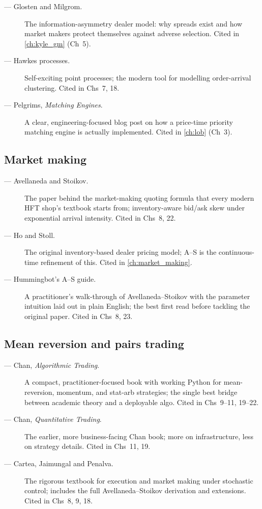 \begin{description}
  \item[\citet{glosten1985bid} --- Glosten and Milgrom.] The
    information-asymmetry dealer model: why spreads exist and how
    market makers protect themselves against adverse selection.
    Cited in \cref{ch:kyle_gm} (Ch~5).
  \item[\citet{hawkes1971spectra} --- Hawkes processes.] Self-exciting
    point processes; the modern tool for modelling order-arrival
    clustering. Cited in Chs~7, 18.
  \item[\citet{pelgrims2020matching} --- Pelgrims, \emph{Matching
    Engines}.] A clear, engineering-focused blog post on how a
    price-time priority matching engine is actually implemented.
    Cited in \cref{ch:lob} (Ch~3).
\end{description}

\subsection{Market making}

\begin{description}
  \item[\citet{avellaneda2008high} --- Avellaneda and Stoikov.] The
    paper behind the market-making quoting formula that every modern
    HFT shop's textbook starts from; inventory-aware bid/ask skew
    under exponential arrival intensity. Cited in Chs~8, 22.
  \item[\citet{hostoll1981} --- Ho and Stoll.] The original
    inventory-based dealer pricing model; A--S is the continuous-time
    refinement of this. Cited in \cref{ch:market_making}.
  \item[\citet{hummingbotASguide} --- Hummingbot's A--S guide.]
    A practitioner's walk-through of Avellaneda--Stoikov with the
    parameter intuition laid out in plain English; the best first
    read before tackling the original paper. Cited in Chs~8, 23.
\end{description}

\subsection{Mean reversion and pairs trading}

\begin{description}
  \item[\citet{chan2013algorithmic} --- Chan, \emph{Algorithmic
    Trading}.] A compact, practitioner-focused book with working
    Python for mean-reversion, momentum, and stat-arb strategies;
    the single best bridge between academic theory and a deployable
    algo. Cited in Chs~9--11, 19--22.
  \item[\citet{chan2022quantitative} --- Chan, \emph{Quantitative
    Trading}.] The earlier, more business-facing Chan book; more
    on infrastructure, less on strategy details. Cited in Chs~11, 19.
  \item[\citet{cartea2015algorithmic} --- Cartea, Jaimungal and
    Penalva.] The rigorous textbook for execution and market making
    under stochastic control; includes the full Avellaneda--Stoikov
    derivation and extensions. Cited in Chs~8, 9, 18.
\end{description}

